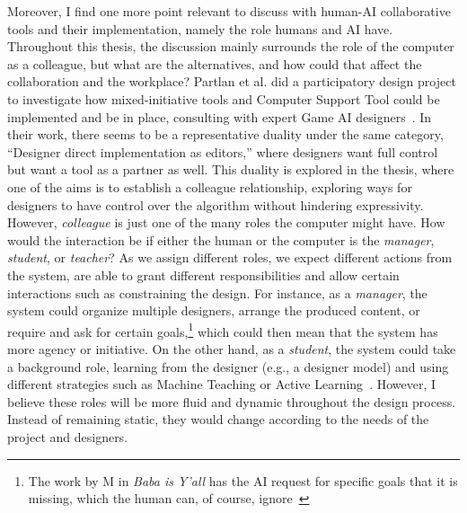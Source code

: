 Moreover, I find one more point relevant to discuss with human-AI collaborative tools and their implementation, namely the role humans and AI have. Throughout this thesis, the discussion mainly surrounds the role of the computer as a colleague, but what are the alternatives, and how could that affect the collaboration and the workplace? Partlan et al. did a participatory design project to investigate how mixed-initiative tools and Computer Support Tool could be implemented and be in place, consulting with expert Game AI designers~\cite{partlan_design-driven_2021}. In their work, there seems to be a representative duality under the same category, ``Designer direct implementation as editors,'' where designers want full control but want a tool as a partner as well. This duality is explored in the thesis, where one of the aims is to establish a colleague relationship, exploring ways for designers to have control over the algorithm without hindering expressivity. However, \emph{colleague} is just one of the many roles the computer might have. How would the interaction be if either the human or the computer is the \emph{manager}, \emph{student}, or \emph{teacher}? As we assign different roles, we expect different actions from the system, are able to grant different responsibilities and allow certain interactions such as constraining the design. For instance, as a \emph{manager}, the system could organize multiple designers, arrange the produced content, or require and ask for certain goals,\footnote{The work by M in \emph{Baba is Y'all} has the AI request for specific goals that it is missing, which the human can, of course, ignore~\cite{charity_baba_2022}} which could then mean that the system has more agency or initiative. On the other hand, as a \emph{student}, the system could take a background role, learning from the designer (e.g., a designer model) and using different strategies such as Machine Teaching or Active Learning~\cite{tegen_taxonomy_2021}. However, I believe these roles will be more fluid and dynamic throughout the design process. Instead of remaining static, they would change according to the needs of the project and designers.




